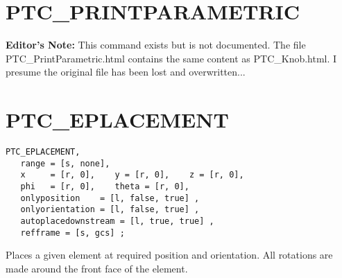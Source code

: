  
% 
% 


% 

\section{PTC\_PRINTPARAMETRIC}
\label{sec:ptc_printparametric}

{\bf Editor's Note:} This command exists but is not documented. The file 
PTC\_PrintParametric.html contains the same content as PTC\_Knob.html. I
presume the original file has been lost and overwritten...


%

\section{PTC\_EPLACEMENT}

\begin{verbatim}
PTC_EPLACEMENT, 
   range = [s, none],
   x     = [r, 0],    y = [r, 0],    z = [r, 0],
   phi   = [r, 0],    theta = [r, 0], 
   onlyposition    = [l, false, true] ,
   onlyorientation = [l, false, true] ,
   autoplacedownstream = [l, true, true] ,
   refframe = [s, gcs] ; 
\end{verbatim}


Places a given element at required position and orientation.  All
rotations are made around the front face of the element.

